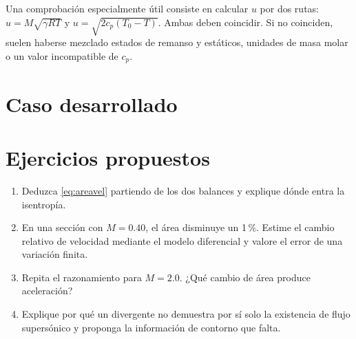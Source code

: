Una comprobación especialmente útil consiste en calcular $u$ por dos rutas: $u=M\sqrt{\gamma RT}$ y $u=\sqrt{2c_p(T_0-T)}$. Ambas deben coincidir. Si no coinciden, suelen haberse mezclado estados de remanso y estáticos, unidades de masa molar o un valor incompatible de $c_p$.
\section{Caso desarrollado}

\section{Ejercicios propuestos}
\begin{enumerate}
\item Deduzca \eqref{eq:areavel} partiendo de los dos balances y explique dónde entra la isentropía.
\item En una sección con $M=0.40$, el área disminuye un 1\,\%. Estime el cambio relativo de velocidad mediante el modelo diferencial y valore el error de una variación finita.
\item Repita el razonamiento para $M=2.0$. ¿Qué cambio de área produce aceleración?
\item Explique por qué un divergente no demuestra por sí solo la existencia de flujo supersónico y proponga la información de contorno que falta.
\end{enumerate}


\studiumchaptercheck
